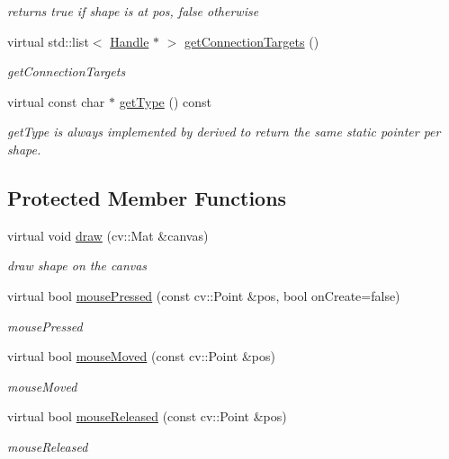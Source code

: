 \begin{DoxyCompactItemize}
\begin{DoxyCompactList}\small\item\em returns true if shape is at pos, false otherwise \end{DoxyCompactList}\item 
virtual std\+::list$<$ \hyperlink{classcanvascv_1_1Handle}{Handle} $\ast$ $>$ \hyperlink{classcanvascv_1_1Rectangle_a90f186627bf00deb4ed1050f68190759}{get\+Connection\+Targets} ()
\begin{DoxyCompactList}\small\item\em get\+Connection\+Targets \end{DoxyCompactList}\item 
virtual const char $\ast$ \hyperlink{classcanvascv_1_1Rectangle_aa66625e0e783029524f669a3113020f5}{get\+Type} () const 
\begin{DoxyCompactList}\small\item\em get\+Type is always implemented by derived to return the same static pointer per shape. \end{DoxyCompactList}\end{DoxyCompactItemize}
\subsection*{Protected Member Functions}
\begin{DoxyCompactItemize}
\item 
virtual void \hyperlink{classcanvascv_1_1Rectangle_a6b75f528a26e50c35ef9adead3489fc8}{draw} (cv\+::\+Mat \&canvas)
\begin{DoxyCompactList}\small\item\em draw shape on the canvas \end{DoxyCompactList}\item 
virtual bool \hyperlink{classcanvascv_1_1Rectangle_ac39753497259e3f6a7fdac667cd08596}{mouse\+Pressed} (const cv\+::\+Point \&pos, bool on\+Create=false)
\begin{DoxyCompactList}\small\item\em mouse\+Pressed \end{DoxyCompactList}\item 
virtual bool \hyperlink{classcanvascv_1_1Rectangle_a0e363f915b93526e034dbfd5550597db}{mouse\+Moved} (const cv\+::\+Point \&pos)
\begin{DoxyCompactList}\small\item\em mouse\+Moved \end{DoxyCompactList}\item 
virtual bool \hyperlink{classcanvascv_1_1Rectangle_a6a54774d57d88d053cfb8d5a41878b16}{mouse\+Released} (const cv\+::\+Point \&pos)
\begin{DoxyCompactList}\small\item\em mouse\+Released \end{DoxyCompactList}\end{DoxyCompactItemize}

